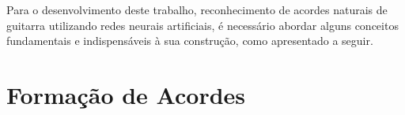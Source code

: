 \begin{table}[H]
   \caption{Mapa dos acordes maiores e menores a serem reconhecidos.}
   \label{tab:acordes}
   \begin{threeparttable}
   \begin{tiny}
   \centering
   \end{tiny}
   \end{threeparttable}
\end{table}%
Para o desenvolvimento deste trabalho, reconhecimento de acordes naturais de guitarra utilizando redes neurais artificiais, é necessário abordar alguns conceitos fundamentais e indispensáveis à sua construção, como apresentado a seguir.

\section{Formação de Acordes}

